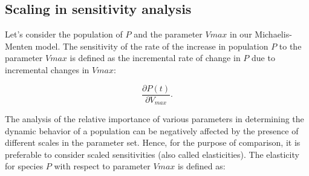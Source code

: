 


\subsection{Scaling in sensitivity analysis}
\label{sec:scaling_expl}
Let's consider the population of $P$ and the parameter $Vmax$ in our Michaelis-Menten model. The sensitivity of the rate of the increase in population $P$ to the parameter $Vmax$ is defined as the incremental rate of change in $P$ due to incremental changes in $Vmax$:

\begin{equation}
\frac{\partial P(t)}{\partial V_{max}}.
\end{equation}

The analysis of the relative importance of various parameters in determining the dynamic behavior of a population can be negatively affected by the presence of different scales in the parameter set. Hence, for the purpose of comparison, it is preferable to consider scaled sensitivities (also called elasticities). The elasticity for species $P$ with respect to parameter $Vmax$ is defined as:

